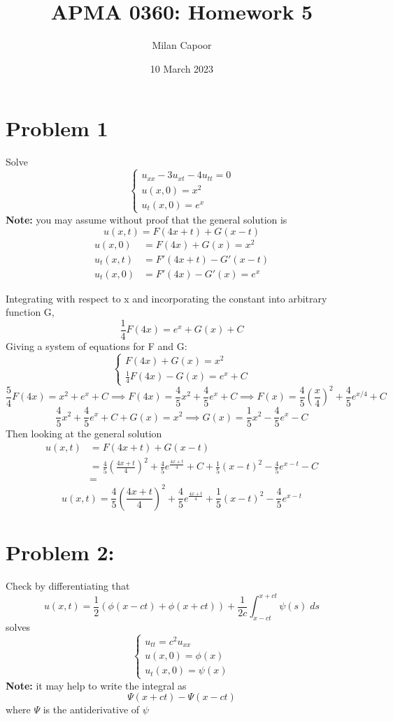 \documentclass[12pt]{article}
\title{APMA 0360: Homework 5}
\author{Milan Capoor}
\date{10 March 2023}
\begin{document}
\maketitle
\section*{Problem 1}
Solve 
\[\begin{cases}
    u_{xx} - 3u_{xt} - 4u_{tt} = 0\\
    u(x, 0) = x^2\\
    u_t(x, 0) = e^x
\end{cases}\]
\textbf{Note:} you may assume without proof that the general solution is 
\[u(x, t) = F(4x  +t) + G(x - t)\]
\color{blue}
\begin{align*}
    u(x, 0) &= F(4x) + G(x) = x^2\\
    u_t(x, t) &= F'(4x + t) - G'(x - t)\\
    u_t(x, 0) &= F'(4x) - G'(x) = e^x
\end{align*}

Integrating with respect to x and incorporating the constant into arbitrary function G, 
\[\frac{1}{4}F(4x) = e^x + G(x) + C\]
Giving a system of equations for F and G:
\[\begin{cases}
    F(4x) + G(x) = x^2\\
    \frac{1}{4}F(4x) - G(x) = e^x + C
\end{cases}\]
\[\frac{5}{4}F(4x) = x^2 + e^x + C \implies F(4x) = \frac{4}{5}x^2 + \frac{4}{5}e^x + C \implies F(x) = \frac{4}{5}\left(\frac{x}{4}\right)^2 + \frac{4}{5}e^{x/4} + C \]
\[ \frac{4}{5}x^2 + \frac{4}{5}e^x + C + G(x) = x^2 \implies G(x) = \frac{1}{5}x^2 - \frac{4}{5}e^x - C\]
Then looking at the general solution
\begin{align*}
    u(x, t) &= F(4x + t) + G(x - t)\\
    &= \frac{4}{5}\left(\frac{4x + t}{4}\right)^2 + \frac{4}{5}e^{\frac{4x + t}{4}} + C + \frac{1}{5}(x -t)^2 - \frac{4}{5}e^{x - t} - C\\
    &= 
\end{align*}
\[\boxed{u(x, t) = \frac{4}{5}\left(\frac{4x + t}{4}\right)^2 + \frac{4}{5}e^{\frac{4x + t}{4}} +\frac{1}{5}(x -t)^2 - \frac{4}{5}e^{x - t}}\]
\color{black}
\pagebreak

\section*{Problem 2:}
Check by differentiating that 
\[u(x, t) = \frac{1}{2}(\phi(x - ct) + \phi(x + ct)) + \frac{1}{2c}\int_{x - ct}^{x+ ct} \psi(s) \; ds\]
solves 
\[\begin{cases}
    u_{tt} = c^2 u_{xx}\\
    u(x, 0) = \phi(x)\\
    u_t(x, 0) = \psi(x)
\end{cases}\]
\textbf{Note:} it may help to write the integral as 
\[\Psi(x + ct) - \Psi(x -ct)\]
where $\Psi$ is the antiderivative of $\psi$
\end{document}

